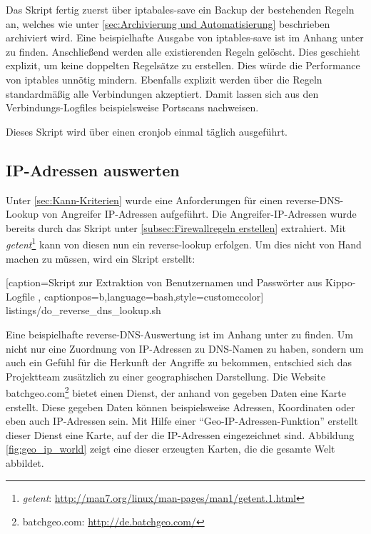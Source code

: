 Das Skript fertig zuerst über iptabales-save ein Backup der bestehenden Regeln an, welches wie unter \ref{sec:Archivierung und Automatisierung} beschrieben archiviert wird. Eine beispielhafte Ausgabe von iptables-save ist im Anhang unter \textit{} zu finden. Anschließend werden alle existierenden Regeln gelöscht. Dies geschieht explizit, um keine doppelten Regelsätze zu erstellen. Dies würde die Performance von iptables unnötig mindern. Ebenfalls explizit werden über die Regeln standardmäßig alle Verbindungen akzeptiert. Damit lassen sich aus den Verbindungs-Logfiles beispielsweise Portscans nachweisen.

Dieses Skript wird über einen cronjob einmal täglich ausgeführt.



\subsection{IP-Adressen auswerten}
\label{subsec:IP-Adressen auswerten}

Unter \ref{sec:Kann-Kriterien} wurde eine Anforderungen für einen reverse-DNS-Lookup von Angreifer IP-Adressen aufgeführt. Die Angreifer-IP-Adressen wurde bereits durch das Skript unter \ref{subsec:Firewallregeln erstellen} extrahiert. Mit \textit{getent}\footnote{ \textit{getent}: \url{http://man7.org/linux/man-pages/man1/getent.1.html}} kann von diesen nun ein reverse-lookup erfolgen. Um dies nicht von Hand machen zu müssen, wird ein Skript erstellt:


    [caption={Skript zur Extraktion von Benutzernamen und Passwörter aus Kippo-Logfile}
       \label{lst:reverse_dns},
       captionpos=b,language=bash,style=customccolor]
 {listings/do_reverse_dns_lookup.sh}

Eine beispielhafte reverse-DNS-Auswertung ist im Anhang unter \textit{} zu finden.
Um nicht nur eine Zuordnung von IP-Adressen zu DNS-Namen zu haben, sondern um auch ein Gefühl für die Herkunft der Angriffe zu bekommen, entschied sich das Projektteam zusätzlich zu einer geographischen Darstellung. Die Website batchgeo.com\footnote{ batchgeo.com: \url{http://de.batchgeo.com/}} bietet einen Dienst, der anhand von gegeben Daten eine Karte erstellt. Diese gegeben Daten können beispielsweise Adressen, Koordinaten oder eben auch IP-Adressen sein. Mit Hilfe einer "`Geo-IP-Adressen-Funktion"' erstellt dieser Dienst eine Karte, auf der die IP-Adressen eingezeichnet sind. Abbildung \ref{fig:geo_ip_world} zeigt eine dieser erzeugten Karten, die die gesamte Welt abbildet.


